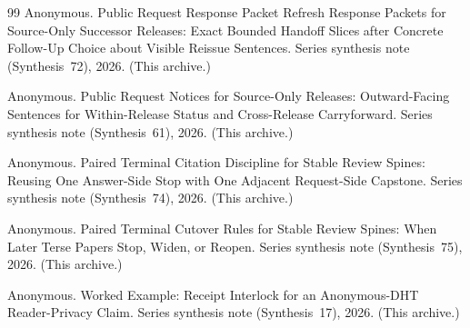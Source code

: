 \documentclass[11pt]{article}
\begin{document}
\begin{thebibliography}{99}
Anonymous.
\newblock Public Request Response Packet Refresh Response Packets for Source-Only Successor Releases: Exact Bounded Handoff Slices after Concrete Follow-Up Choice about Visible Reissue Sentences.
\newblock Series synthesis note (Synthesis~72), 2026. (This archive.)

Anonymous.
\newblock Public Request Notices for Source-Only Releases: Outward-Facing Sentences for Within-Release Status and Cross-Release Carryforward.
\newblock Series synthesis note (Synthesis~61), 2026. (This archive.)

Anonymous.
\newblock Paired Terminal Citation Discipline for Stable Review Spines: Reusing One Answer-Side Stop with One Adjacent Request-Side Capstone.
\newblock Series synthesis note (Synthesis~74), 2026. (This archive.)

Anonymous.
\newblock Paired Terminal Cutover Rules for Stable Review Spines: When Later Terse Papers Stop, Widen, or Reopen.
\newblock Series synthesis note (Synthesis~75), 2026. (This archive.)

Anonymous.
\newblock Worked Example: Receipt Interlock for an Anonymous-DHT Reader-Privacy Claim.
\newblock Series synthesis note (Synthesis~17), 2026. (This archive.)

\end{thebibliography}
\end{document}

